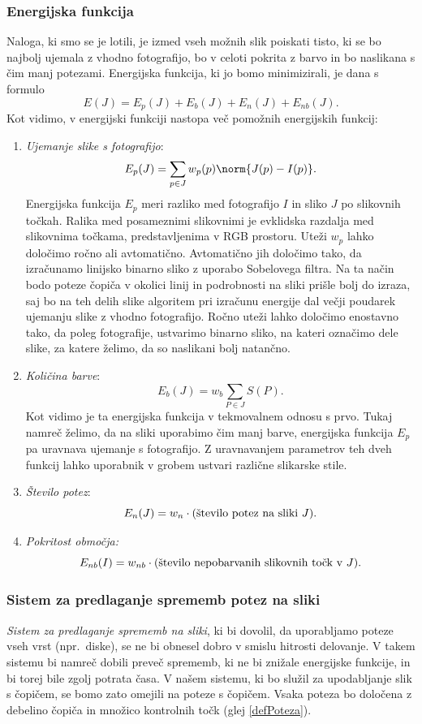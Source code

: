 \subsubsection{Energijska funkcija}
Naloga, ki smo se je lotili, je izmed vseh možnih slik poiskati tisto, ki se bo najbolj ujemala z vhodno fotografijo, bo v celoti pokrita z barvo in bo naslikana s čim manj potezami. Energijska funkcija, ki jo bomo minimizirali, je dana s formulo
%
$$E(J) = E_{p}(J) + E_{b}(J) + E_{n}(J) + E_{nb}(J).$$
%
Kot vidimo, v energijski funkciji nastopa več pomožnih energijskih funkcij:
%
\begin{enumerate}
\item \emph{Ujemanje slike s fotografijo}:
$$E_{p}(J) = \sum_{p \in J} w_{p}(p) \norm{J(p) - I(p)}.$$
Energijska funkcija $E_p$ meri razliko med fotografijo $I$ in sliko $J$ po slikovnih točkah. Ralika med posameznimi slikovnimi je evklidska razdalja med slikovnima točkama, predstavljenima v RGB prostoru. Uteži $w_p$ lahko določimo ročno ali avtomatično. Avtomatično jih določimo tako, da izračunamo linijsko binarno sliko z uporabo Sobelovega filtra. Na ta način bodo poteze čopiča v okolici linij in podrobnosti na sliki prišle bolj do izraza, saj bo na teh delih slike algoritem pri izračunu energije dal večji poudarek ujemanju slike z vhodno fotografijo. Ročno uteži lahko določimo enostavno tako, da poleg fotografije, ustvarimo binarno sliko, na kateri označimo dele slike, za katere želimo, da so naslikani bolj natančno.
%
\item \emph{Količina barve}:
$$E_{b}(J) = w_{b} \sum_{P \in J} S(P).$$
Kot vidimo je ta energijska funkcija v tekmovalnem odnosu s prvo. Tukaj namreč želimo, da na sliki uporabimo čim manj barve, energijska funkcija $E_p$ pa uravnava ujemanje s fotografijo. Z uravnavanjem parametrov teh dveh funkcij lahko uporabnik v grobem ustvari različne slikarske stile.
%
\item \emph{Število potez}:
$$E_{n}(J) = w_{n} \cdot \textup{(število potez na sliki $J$)}.$$
%
\item \emph{Pokritost območja:}
$$E_{nb}(I) = w_{nb} \cdot \textup{(število nepobarvanih slikovnih točk v $J$)}.$$
\end{enumerate}
%
\subsubsection{Sistem za predlaganje sprememb potez na sliki}
%
\emph{Sistem za predlaganje sprememb na sliki}, ki bi dovolil, da uporabljamo poteze vseh vrst (npr.~diske), se ne bi obnesel dobro v smislu hitrosti delovanje. V takem sistemu bi namreč dobili preveč sprememb, ki ne bi znižale energijske funkcije, in bi torej bile zgolj potrata časa. V našem sistemu, ki bo služil za upodabljanje slik s čopičem, se bomo zato omejili na poteze s čopičem. Vsaka poteza bo določena z debelino čopiča in množico kontrolnih točk (glej \ref{defPoteza}). %

